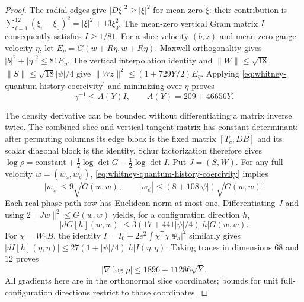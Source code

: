 \begin{proof}
The radial edges give \(|D\xi|^2\geq|\xi|^2\) for mean-zero
\(\xi\): their contribution is
\(\sum_{i=1}^{12}(\xi_i-\xi_0)^2=|\xi|^2+13\xi_0^2\).
The mean-zero vertical Gram matrix \(I\) consequently satisfies
\(I\geq1/81\). For a slice velocity \((b,z)\) and mean-zero
gauge velocity \(\eta\), let
\(E_\eta=G(w+R\eta,w+R\eta)\). Maxwell orthogonality gives
\(|b|^2+|\eta|^2\leq81E_\eta\). The vertical interpolation identity
and \(\|W\|\leq\sqrt{18}\), \(\|S\|\leq\sqrt{18}|\psi|/4\)
give
\(\|Wz\|^2\leq(1+729Y/2)E_\eta\). Applying
\eqref{eq:whitney-quantum-history-coercivity} and minimizing over
\(\eta\) proves
\begin{equation}
 \gamma^{-1}\leq A(Y)I,\qquad A(Y)=209+46656Y.
 \label{eq:whitney-quantum-history-inverse}
\end{equation}

The density derivative can be bounded without differentiating a matrix
inverse twice. The combined slice and vertical tangent matrix has constant
determinant: after permuting columns its edge block is the fixed matrix
\([T_c,DB]\) and its scalar diagonal block is the identity. Schur
factorization therefore gives
\(\log\rho=\mathrm{constant}+\tfrac12\log\det G-\tfrac12\log\det I\).
Put \(J=(S,W)\). For any full velocity \(w=(w_a,w_\psi)\),
\eqref{eq:whitney-quantum-history-coercivity} implies
\[
 |w_a|\leq9\sqrt{G(w,w)},\qquad
 |w_\psi|\leq(8+108|\psi|)\sqrt{G(w,w)}.
\]
Each real phase-path row has Euclidean norm at most one. Differentiating
\(J\) and using \(2\|Jw\|^2\leq G(w,w)\) yields, for a
configuration direction \(h\),
\[
 |dG[h](w,w)|\leq3(17+441|\psi|/4)|h|G(w,w).
\]
For \(\chi=W_0B\), the identity
\(I=I_0+2e^2\int\chi^{\mathsf T}\chi|\Psi_a|^2\)
similarly gives
\(|dI[h](\eta,\eta)|\leq27(1+|\psi|/4)|h|I(\eta,\eta)\).
Taking traces in dimensions \(68\) and \(12\) proves
\begin{equation}
 |\nabla\log\rho|\leq1896+11286\sqrt Y.
 \label{eq:whitney-quantum-history-density}
\end{equation}
All gradients here are in the orthonormal slice coordinates; bounds for
unit full-configuration directions restrict to those coordinates.


\end{proof}
